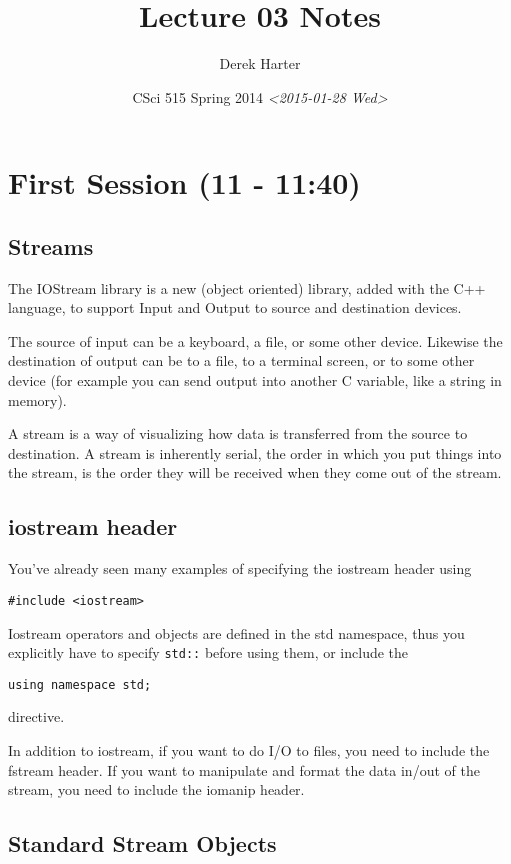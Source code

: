 \documentclass[11pt]{article}
\author{Derek Harter}
\date{CSci 515 Spring 2014 \textit{<2015-01-28 Wed>}}
\title{Lecture 03 Notes}
\begin{document}
\maketitle

\section{First Session (11 - 11:40)}
\label{sec-1}
\subsection{Streams}
\label{sec-1-1}
The IOStream library is a new (object oriented) library, added with the C++
language, to support Input and Output to source and destination devices.

The source of input can be a keyboard, a file, or some other device.  Likewise
the destination of output can be to a file, to a terminal screen, or to some
other device (for example you can send output into another C variable, like
a string in memory).

A stream is a way of visualizing how data is transferred from the source to 
destination.  A stream is inherently serial, the order in which you put things
into the stream, is the order they will be received when they come out of the
stream.
\subsection{iostream header}
\label{sec-1-2}
You've already seen many examples of specifying the iostream header using

\begin{verbatim}
#include <iostream>
\end{verbatim}

Iostream operators and objects are defined in the std namespace, thus you
explicitly have to specify \verb~std::~ before using them, or include the

\begin{verbatim}
using namespace std;
\end{verbatim}

directive.

In addition to iostream, if you want to do I/O to files, you need to include
the fstream header.  If you want to manipulate and format the data in/out of
the stream, you need to include the iomanip header.
\subsection{Standard Stream Objects}
\label{sec-1-3}
\end{document}
